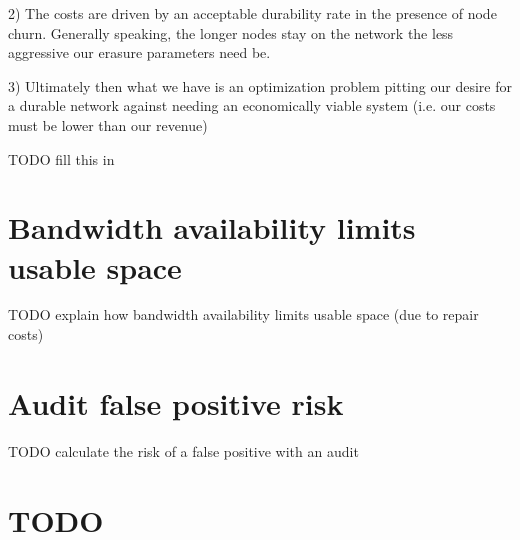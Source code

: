 \documentclass[11pt,fleqn,openany]{book}
\newcommand{\todo}[1]{{\color{red} TODO #1 }}
\begin{document}
2) The costs are driven by an acceptable durability rate in the presence of
node churn.
Generally speaking, the longer nodes stay on the network the less aggressive
our erasure parameters need be.

3) Ultimately then what we have is an optimization problem pitting our desire
for a durable network against needing an economically viable system (i.e. our
costs must be lower than our revenue)

\todo{fill this in}

\chapter{Bandwidth availability limits usable space}\label{appendix:bandwidth-space-limits}

\todo{explain how bandwidth availability limits usable space (due to repair costs)}

\chapter{Audit false positive risk}\label{appendix:audit-false-positive}

\todo{calculate the risk of a false positive with an audit}

\chapter{TODO}
\end{document}
